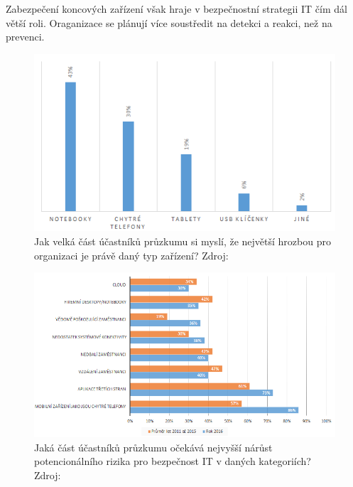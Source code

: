 Zabezpečení koncových zařízení však hraje v bezpečnostní strategii IT čím dál větší roli. Oraganizace se plánují více soustředit na detekci a reakci, než na prevenci. 





\begin{figure}[h!]\label{hrozbyZarizeni}
\centering
\includegraphics[width=12cm]{img/hrozbyZarizeni}
\caption{Jak velká část účastníků průzkumu si myslí, že největší hrozbou pro organizaci je právě daný typ zařízení? Zdroj: } 
\end{figure}



\begin{figure}[h!]\label{hrozbyDuvody}
\centering
\includegraphics[width=13cm]{img/hrozbyDuvody}
\caption{Jaká část účastníků průzkumu očekává nejvyšší nárůst potencionálního rizika pro bezpečnost IT v daných kategoriích? Zdroj: } 
\end{figure}

